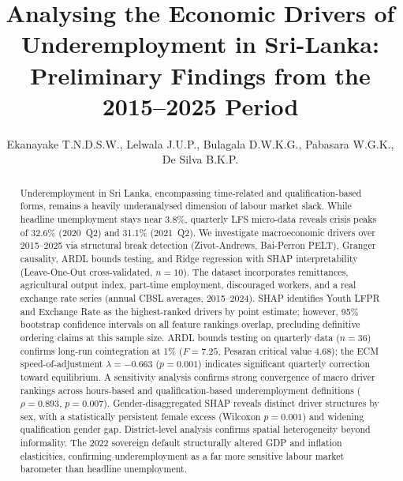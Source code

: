 \documentclass[sigconf]{acmart}
\begin{document}
\title{Analysing the Economic Drivers of Underemployment in Sri-Lanka: Preliminary Findings from the 2015--2025 Period}


\author{
Ekanayake T.N.D.S.W.,
Lelwala J.U.P.,
Bulagala D.W.K.G.,
Pabasara W.G.K.,
De Silva B.K.P.
}



\begin{abstract}
Underemployment in Sri Lanka, encompassing time-related and
qualification-based forms, remains a heavily underanalysed dimension of
labour market slack. While headline unemployment stays near 3.8\%, quarterly
LFS micro-data reveals crisis peaks of 32.6\% (2020~Q2) and 31.1\%
(2021~Q2). We investigate macroeconomic drivers over 2015--2025 via
structural break detection (Zivot-Andrews, Bai-Perron PELT), Granger
causality, ARDL bounds testing, and Ridge regression with SHAP
interpretability (Leave-One-Out cross-validated, $n{=}10$).
The dataset incorporates remittances, agricultural output index,
part-time employment, discouraged workers, and a real exchange rate series
(annual CBSL averages, 2015--2024). SHAP identifies Youth LFPR and
Exchange Rate as the highest-ranked drivers by point estimate; however,
95\% bootstrap confidence intervals on all feature rankings overlap,
precluding definitive ordering claims at this sample size.
ARDL bounds testing on quarterly data
($n{=}36$) confirms long-run cointegration at 1\% ($F{=}7.25$, Pesaran
critical value 4.68); the ECM speed-of-adjustment $\lambda{=}{-0.663}$
($p{=}0.001$) indicates significant quarterly correction toward
equilibrium. A sensitivity analysis confirms strong convergence of macro
driver rankings across hours-based and qualification-based underemployment
definitions ($\rho = 0.893$, $p = 0.007$). Gender-disaggregated SHAP
reveals distinct driver structures by sex, with a statistically persistent
female excess (Wilcoxon $p = 0.001$) and widening qualification gender gap.
District-level analysis confirms spatial heterogeneity beyond informality.
The 2022 sovereign default structurally altered GDP and inflation
elasticities, confirming underemployment as a far more sensitive labour
market barometer than headline unemployment.
\end{abstract}
\end{document}
